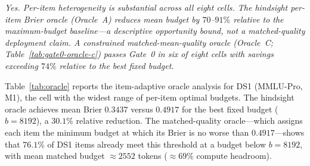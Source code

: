 \documentclass[a4paper,fleqn]{cas-sc}
\theoremstyle{plain}
\theoremstyle{definition}
\theoremstyle{remark}
\begin{document}
\textit{Yes. Per-item heterogeneity is substantial across all eight cells.
The hindsight per-item Brier oracle (Oracle~A) reduces mean budget by
$70$--$91\%$ relative to the maximum-budget baseline---a descriptive
opportunity bound, not a matched-quality deployment claim.
A constrained matched-mean-quality oracle (Oracle~C; Table~\ref{tab:gate0-oracle-c})
passes Gate~0 in six of eight cells with savings exceeding $74\%$ relative
to the best fixed budget.}

Table~\ref{tab:oracle} reports the item-adaptive oracle analysis for DS1
(MMLU-Pro, M1), the cell with the widest range of per-item optimal budgets.
The hindsight oracle achieves mean Brier $0.3437$ versus $0.4917$ for the
best fixed budget ($b=8192$), a $30.1\%$ relative reduction.
The matched-quality oracle---which assigns each item the minimum budget at
which its Brier is no worse than $0.4917$---shows that $76.1\%$ of DS1 items
already meet this threshold at a budget below $b=8192$, with mean matched
budget ${\approx}2552$ tokens (${\approx}69\%$ compute headroom).
\end{document}
